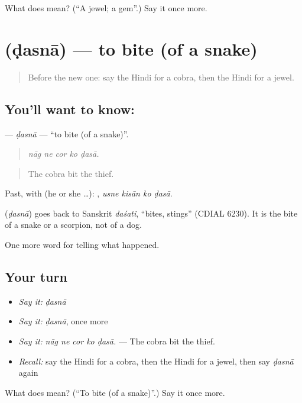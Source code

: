 \begin{tcolorbox}[breakable,colback=teal!4,colframe=teal!35!black,title={Before you move on}]
What does  mean? (\textquotedblleft{}A jewel; a gem\textquotedblright{}.) Say it once more.
\end{tcolorbox}
\section[\texorpdfstring{\hi{डसना} (ḍasnā)}{डसना (ḍasnā)}]{ (ḍasnā) — to bite (of a snake)}

\label{lesson:HI-C337-dasna}



\begin{quote}
Before the new one: say the Hindi for a cobra, then the Hindi for a jewel.
\end{quote}

\subsection*{You'll want to know: }
\textbf{} — \emph{ḍasnā} — \textquotedblleft{}to bite (of a snake)\textquotedblright{}.

\begin{quote}
    
\end{quote}

\begin{quote}
\emph{nāg ne cor ko ḍasā.}
\end{quote}

\begin{quote}
The cobra bit the thief.
\end{quote}

Past, with  (he or she …):    , \emph{usne kisān ko ḍasā}.

\begin{cousinweb}
\textbf{} (\emph{ḍasnā}) goes back to Sanskrit \emph{daśati}, \textquotedblleft{}bites, stings\textquotedblright{} (CDIAL 6230). It is the bite of a snake or a scorpion, not of a dog.
\end{cousinweb}

\begin{grammarlens}[title={What you've built}]
One more word for telling what happened.
\end{grammarlens}

\subsection*{Your turn}
\begin{itemize}
\raggedright
  \item \emph{Say it:} \emph{ḍasnā}
  \item \emph{Say it:} \emph{ḍasnā}, once more
  \item \emph{Say it:} \emph{nāg ne cor ko ḍasā.} — The cobra bit the thief.
  \item \emph{Recall:} say the Hindi for a cobra, then the Hindi for a jewel, then say \emph{ḍasnā} again
\end{itemize}

\begin{tcolorbox}[breakable,colback=teal!4,colframe=teal!35!black,title={Before you move on}]
What does  mean? (\textquotedblleft{}To bite (of a snake)\textquotedblright{}.) Say it once more.
\end{tcolorbox}

